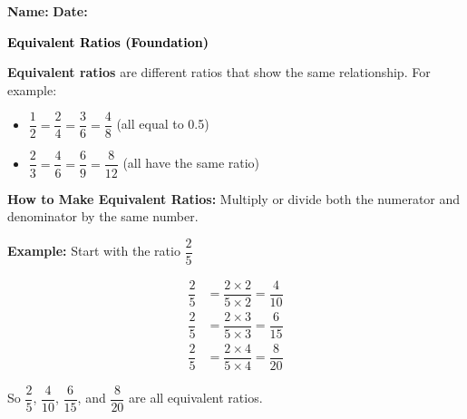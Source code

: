 \documentclass[12pt, letterpaper, fleqn]{article}
\begin{document}
\textbf{Name:} \underline{\hspace{5cm}}
\hfill
\textbf{Date:} \underline{\hspace{3cm}}\\

\begin{tcolorbox}[colback=customteal!20]
    \large\textcolor{black}{\textbf{Equivalent Ratios (Foundation)}}
\end{tcolorbox}

\vspace{3mm}

\noindent
\textbf{Equivalent ratios} are different ratios that show the same relationship. For example:

\begin{itemize}
    \item $\dfrac{1}{2} = \dfrac{2}{4} = \dfrac{3}{6} = \dfrac{4}{8}$ (all equal to 0.5)
    \item $\dfrac{2}{3} = \dfrac{4}{6} = \dfrac{6}{9} = \dfrac{8}{12}$ (all have the same ratio)
\end{itemize}

\medskip

\noindent
\textbf{How to Make Equivalent Ratios:} Multiply or divide both the numerator and denominator by the same number.

\vspace{3mm}

\begin{tcolorbox}[colback=white, colframe=black!25, boxrule=0.6pt, arc=4mm, left=6mm, right=6mm, top=5mm, bottom=5mm]

\textbf{Example:} Start with the ratio $\dfrac{2}{5}$

\begin{align*}
\dfrac{2}{5} &= \dfrac{2 \times 2}{5 \times 2} = \dfrac{4}{10} \\
\dfrac{2}{5} &= \dfrac{2 \times 3}{5 \times 3} = \dfrac{6}{15} \\
\dfrac{2}{5} &= \dfrac{2 \times 4}{5 \times 4} = \dfrac{8}{20}
\end{align*}

\noindent
So $\dfrac{2}{5}$, $\dfrac{4}{10}$, $\dfrac{6}{15}$, and $\dfrac{8}{20}$ are all equivalent ratios.

\end{tcolorbox}

\vspace{4mm}
\end{document}
